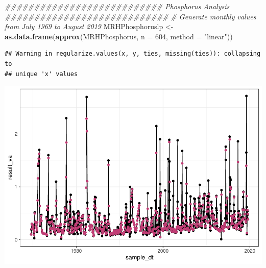 \documentclass[12pt,]{article}
\newenvironment{Shaded}{\begin{snugshade}}{\end{snugshade}}
\newcommand{\CommentTok}[1]{\textcolor[rgb]{0.56,0.35,0.01}{\textit{#1}}}
\newcommand{\DataTypeTok}[1]{\textcolor[rgb]{0.13,0.29,0.53}{#1}}
\newcommand{\DecValTok}[1]{\textcolor[rgb]{0.00,0.00,0.81}{#1}}
\newcommand{\KeywordTok}[1]{\textcolor[rgb]{0.13,0.29,0.53}{\textbf{#1}}}
\newcommand{\NormalTok}[1]{#1}
\newcommand{\OperatorTok}[1]{\textcolor[rgb]{0.81,0.36,0.00}{\textbf{#1}}}
\newcommand{\StringTok}[1]{\textcolor[rgb]{0.31,0.60,0.02}{#1}}
\begin{document}
\begin{Shaded}
\begin{Highlighting}[]
\CommentTok{########################### Phosphorus Analysis ############################}
\CommentTok{# Generate monthly values from July 1969 to August 2019}
\NormalTok{MRHPhosphoruslp <-}\StringTok{ }\KeywordTok{as.data.frame}\NormalTok{(}\KeywordTok{approx}\NormalTok{(MRHPhosphorus, }\DataTypeTok{n =} \DecValTok{604}\NormalTok{, }\DataTypeTok{method =} \StringTok{"linear"}\NormalTok{))}
\end{Highlighting}
\end{Shaded}

\begin{verbatim}
## Warning in regularize.values(x, y, ties, missing(ties)): collapsing to
## unique 'x' values
\end{verbatim}

\begin{Shaded}
\end{Shaded}

\includegraphics{Project_Template_files/figure-latex/unnamed-chunk-6-18.pdf}
\end{document}
